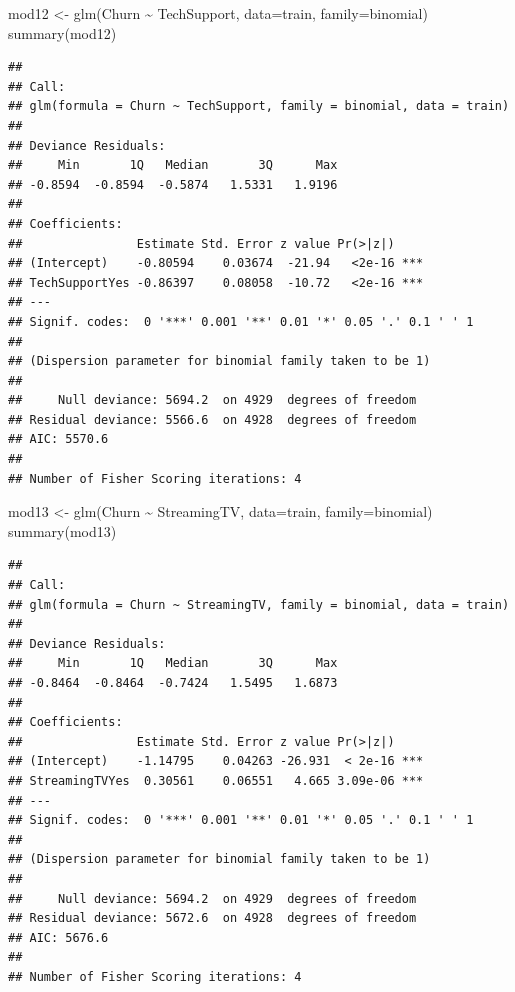 \documentclass[
  twoside]{article}
\newenvironment{Shaded}{\begin{snugshade}}{\end{snugshade}}
\newcommand{\AttributeTok}[1]{\textcolor[rgb]{0.77,0.63,0.00}{#1}}
\newcommand{\FunctionTok}[1]{\textcolor[rgb]{0.00,0.00,0.00}{#1}}
\newcommand{\NormalTok}[1]{#1}
\newcommand{\OtherTok}[1]{\textcolor[rgb]{0.56,0.35,0.01}{#1}}
\newcommand{\SpecialCharTok}[1]{\textcolor[rgb]{0.00,0.00,0.00}{#1}}
\begin{document}
\begin{Shaded}
\begin{Highlighting}[]
\NormalTok{mod12 }\OtherTok{\textless{}{-}} \FunctionTok{glm}\NormalTok{(Churn }\SpecialCharTok{\textasciitilde{}}\NormalTok{ TechSupport, }\AttributeTok{data=}\NormalTok{train, }\AttributeTok{family=}\NormalTok{binomial)}
\FunctionTok{summary}\NormalTok{(mod12)}
\end{Highlighting}
\end{Shaded}

\begin{verbatim}
## 
## Call:
## glm(formula = Churn ~ TechSupport, family = binomial, data = train)
## 
## Deviance Residuals: 
##     Min       1Q   Median       3Q      Max  
## -0.8594  -0.8594  -0.5874   1.5331   1.9196  
## 
## Coefficients:
##                Estimate Std. Error z value Pr(>|z|)    
## (Intercept)    -0.80594    0.03674  -21.94   <2e-16 ***
## TechSupportYes -0.86397    0.08058  -10.72   <2e-16 ***
## ---
## Signif. codes:  0 '***' 0.001 '**' 0.01 '*' 0.05 '.' 0.1 ' ' 1
## 
## (Dispersion parameter for binomial family taken to be 1)
## 
##     Null deviance: 5694.2  on 4929  degrees of freedom
## Residual deviance: 5566.6  on 4928  degrees of freedom
## AIC: 5570.6
## 
## Number of Fisher Scoring iterations: 4
\end{verbatim}

\begin{Shaded}
\begin{Highlighting}[]
\NormalTok{mod13 }\OtherTok{\textless{}{-}} \FunctionTok{glm}\NormalTok{(Churn }\SpecialCharTok{\textasciitilde{}}\NormalTok{ StreamingTV, }\AttributeTok{data=}\NormalTok{train, }\AttributeTok{family=}\NormalTok{binomial)}
\FunctionTok{summary}\NormalTok{(mod13)}
\end{Highlighting}
\end{Shaded}

\begin{verbatim}
## 
## Call:
## glm(formula = Churn ~ StreamingTV, family = binomial, data = train)
## 
## Deviance Residuals: 
##     Min       1Q   Median       3Q      Max  
## -0.8464  -0.8464  -0.7424   1.5495   1.6873  
## 
## Coefficients:
##                Estimate Std. Error z value Pr(>|z|)    
## (Intercept)    -1.14795    0.04263 -26.931  < 2e-16 ***
## StreamingTVYes  0.30561    0.06551   4.665 3.09e-06 ***
## ---
## Signif. codes:  0 '***' 0.001 '**' 0.01 '*' 0.05 '.' 0.1 ' ' 1
## 
## (Dispersion parameter for binomial family taken to be 1)
## 
##     Null deviance: 5694.2  on 4929  degrees of freedom
## Residual deviance: 5672.6  on 4928  degrees of freedom
## AIC: 5676.6
## 
## Number of Fisher Scoring iterations: 4
\end{verbatim}
\end{document}
